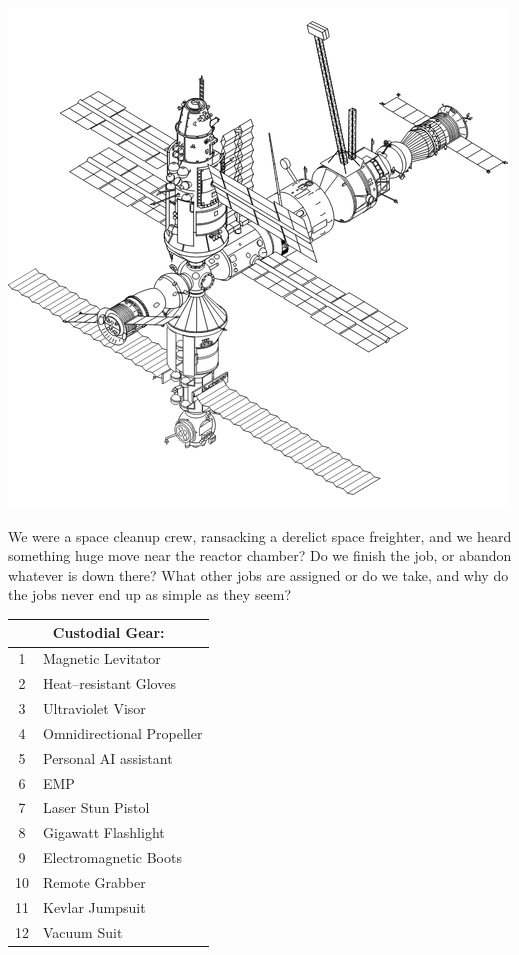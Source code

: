 \documentclass[landscape]{book}
\begin{document}
\begin{multicols*}{4}
\includegraphics[width=\columnwidth]{./station}

We were a space cleanup crew, ransacking a derelict space freighter, and we heard something huge move near the reactor chamber?
Do we finish the job, or abandon whatever is down there?
What other jobs are assigned or do we take, and why do the jobs never end up as simple as they seem?
\begin{center}
  \begin{tabular}{|c|p{}|}
    \hline \multicolumn{2}{|c|}{Custodial Gear:} \\
    \hline 1 & Magnetic Levitator \\
    2 & Heat--resistant Gloves \\
    3 & Ultraviolet Visor \\
    4 & Omnidirectional Propeller \\
    5 & Personal AI assistant \\
    6 & EMP \\
    7 & Laser Stun Pistol \\
    8 & Gigawatt Flashlight \\
    9 & Electromagnetic Boots \\
    10 & Remote Grabber \\
    11 & Kevlar Jumpsuit \\
    12 & Vacuum Suit \\ \hline
  \end{tabular}
\end{center}


\end{multicols*}
\end{document}
